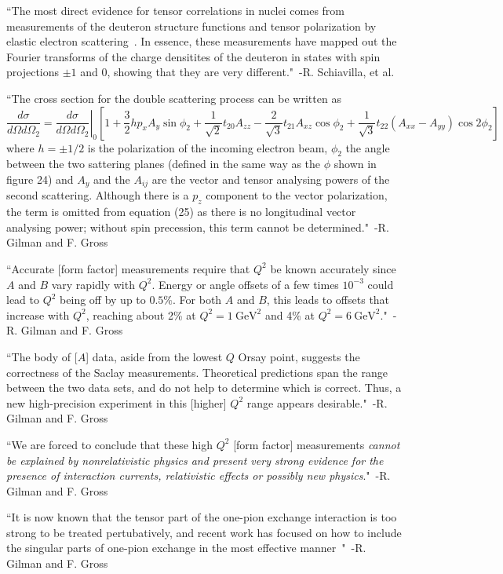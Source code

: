 ``The most direct evidence for tensor correlations in nuclei comes from measurements of the deuteron structure functions and tensor polarization by elastic electron scattering~\cite{Gilman:2001yh}. In essence, these measurements have mapped out the Fourier transforms of the charge densitites of the deuteron in states with spin projections $\pm1$ and 0, showing that they are very different."~-R. Schiavilla, et al.~\cite{Schiavilla:2006xx}


``The cross section for the double scattering process can be written as~\cite{Arnold:1979cg}
\begin{dmath}
	\frac{d\sigma}{d\Omega d\Omega_2} = \left. \frac{d\sigma}{d\Omega d\Omega_2}\right|_0 \left[1 + \frac{3}{2}hp_xA_y\sin{\phi_2} + \frac{1}{\sqrt{2}}t_{20}A_{zz} - \frac{2}{\sqrt{3}}t_{21}A_{xz}\cos{\phi_2}+\frac{1}{\sqrt{3}}t_{22}\left( A_{xx} - A_{yy} \right) \cos{2\phi_2}  \right]
\end{dmath}
where $h=\pm 1/2$ is the polarization of the incoming electron beam, $\phi_2$ the angle between the two sattering planes (defined in the same way as the $\phi$ shown in figure 24) and $A_y$ and the $A_{ij}$ are the vector and tensor analysing powers of the second scattering. Although there is a $p_z$ component to the vector polarization, the term is omitted from equation (25) as there is no longitudinal vector analysing power; without spin precession, this term cannot be determined."~-R. Gilman and F. Gross~\cite{Gilman:2001yh}

``Accurate [form factor] measurements require that $Q^2$ be known accurately since $A$ and $B$ vary rapidly with $Q^2$. Energy or angle offsets of a few times $10^{-3}$ could lead to $Q^2$ being off by up to $0.5\%$. For both $A$ and $B$, this leads to offsets that increase with $Q^2$, reaching about 2\% at $Q^2=1\mathrm{~GeV}^2$ and 4\% at $Q^2=6\mathrm{~GeV}^2$."~-R. Gilman and F. Gross~\cite{Gilman:2001yh}

``The body of [$A$] data, aside from the lowest $Q$ Orsay point, suggests the correctness of the Saclay measurements. Theoretical predictions span the range between the two data sets, and do not help to determine which is correct. Thus, a new high-precision experiment in this [higher] $Q^2$ range appears desirable."~-R. Gilman and F. Gross~\cite{Gilman:2001yh}

``We are forced to conclude that these high $Q^2$ [form factor] measurements \emph{cannot be explained by nonrelativistic physics and present very strong evidence for the presence of interaction currents, relativistic effects or possibly new physics}."~-R. Gilman and F. Gross~\cite{Gilman:2001yh}

``It is now known that the tensor part of the one-pion exchange interaction is too strong to be treated pertubatively, and recent work has focused on how to include the singular parts of one-pion exchange in the most effective manner~\cite{Phillips:1999hh,Phillips:1999am,Walzl:2001vb}"~-R. Gilman and F. Gross~\cite{Gilman:2001yh}
